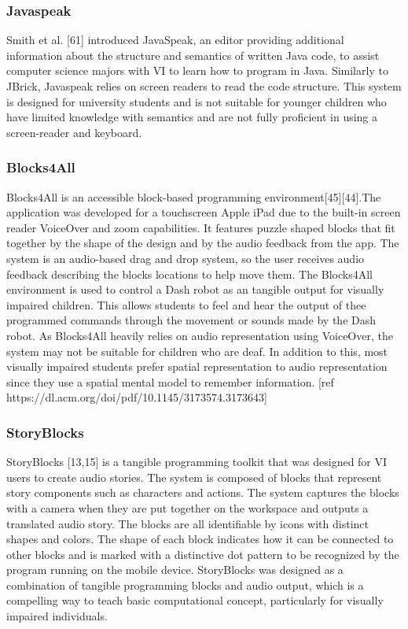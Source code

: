 \documentclass[oneside,%
                    author={Malak Hajji},
                    degree={BSc},
                    title={Designing An Accessible Computational Toolkit For Students},
                  subtitle={With Mixed Visual Abilities}]{dissertation}
\begin{document}
\subsubsection{Javaspeak}
Smith et al. [61] introduced JavaSpeak, an editor providing additional information about the structure and semantics of written Java code, to assist computer science majors with VI to learn how to program in Java. Similarly to JBrick, Javaspeak  relies on screen readers to read the code structure. This system is designed for university students and is not suitable for younger children who have limited knowledge with semantics and are not fully proficient in using a screen-reader and keyboard.

\subsubsection{Blocks4All}

Blocks4All is an accessible block-based programming environment[45][44].The application was developed for a touchscreen Apple iPad due to the built-in screen reader VoiceOver and zoom capabilities. It features puzzle shaped blocks that fit together by the shape of the design and by the audio feedback from the app. The system is an audio-based drag and drop system, so the user receives audio feedback describing the blocks locations to help move them. The Blocks4All environment is used to control a Dash robot as an tangible output for visually impaired children. This allows students to feel and hear the output of thee programmed commands through the movement or sounds made by the Dash robot. As Blocks4All heavily relies on audio representation using VoiceOver, the system may not be suitable for children who are deaf. In addition to this, most visually impaired students prefer spatial representation to audio representation since they use a spatial mental model to remember information. [ref https://dl.acm.org/doi/pdf/10.1145/3173574.3173643]

\subsubsection{StoryBlocks}
StoryBlocks [13,15] is a tangible programming toolkit that was designed for VI users to create audio stories. The system is composed of blocks that represent story components such as characters and actions. The system captures the blocks with a camera when they are put together on the workspace and outputs a translated audio story. The blocks are all identifiable by icons with distinct shapes and colors. The shape of each block indicates how it can be connected to other blocks and is marked with a distinctive dot pattern to be recognized by the program running on the mobile device. StoryBlocks was designed as a combination of tangible programming blocks and audio output, which is a compelling way to teach basic computational concept, particularly for visually impaired individuals.
\end{document}
